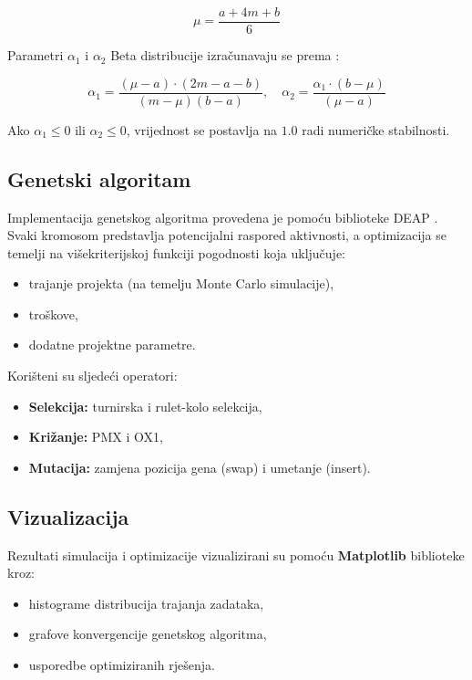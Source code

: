 \[
\mu = \frac{a + 4m + b}{6}
\]

Parametri $\alpha_1$ i $\alpha_2$ Beta distribucije izračunavaju se prema \cite{Vose2008}:

\[
\alpha_1 = \frac{(\mu - a) \cdot (2m - a - b)}{(m - \mu)(b - a)}, \quad
\alpha_2 = \frac{\alpha_1 \cdot (b - \mu)}{(\mu - a)}
\]

Ako $\alpha_1 \leq 0$ ili $\alpha_2 \leq 0$, vrijednost se postavlja na $1.0$ radi numeričke stabilnosti.

\subsection{Genetski algoritam}

Implementacija genetskog algoritma provedena je pomoću biblioteke DEAP \cite{DEAP2012}.  
Svaki kromosom predstavlja potencijalni raspored aktivnosti, a optimizacija se temelji na višekriterijskoj funkciji pogodnosti koja uključuje:
\begin{itemize}
    \item trajanje projekta (na temelju Monte Carlo simulacije),
    \item troškove,
    \item dodatne projektne parametre.
\end{itemize}

Korišteni su sljedeći operatori:
\begin{itemize}
    \item \textbf{Selekcija:} turnirska i rulet-kolo selekcija,
    \item \textbf{Križanje:} PMX i OX1,
    \item \textbf{Mutacija:} zamjena pozicija gena (swap) i umetanje (insert).
\end{itemize}

\subsection{Vizualizacija}

Rezultati simulacija i optimizacije vizualizirani su pomoću \textbf{Matplotlib} \cite{Hunter2007} biblioteke kroz:
\begin{itemize}
    \item histograme distribucija trajanja zadataka,
    \item grafove konvergencije genetskog algoritma,
    \item usporedbe optimiziranih rješenja.
\end{itemize}


